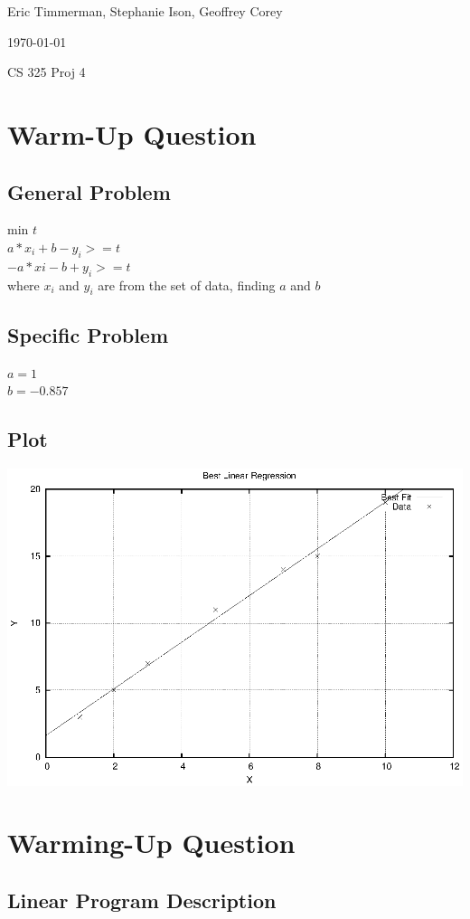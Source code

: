 \documentclass[letterpaper,10pt,titlepage]{article}
\def\name{Eric Timmerman, Stephanie Ison, Geoffrey Corey}
\begin{document}
\hfill \name

\hfill \today

\hfill CS 325 Proj 4

\section{Warm-Up Question}
\subsection*{General Problem}
min $t$\\
$a*x_{i} + b - y_{i} >= t$\\
$-a*x{i} - b + y_{i} >= t$\\
where $x_{i}$ and $y_{i}$ are from the set of data, finding $a$ and $b$
\subsection*{Specific Problem}
$a = 1$\\
$b = -0.857$

\subsection*{Plot}
\includegraphics[width=\textwidth]{warmup.eps}

\section{Warming-Up Question}
\subsection*{Linear Program Description}
\end{document}
